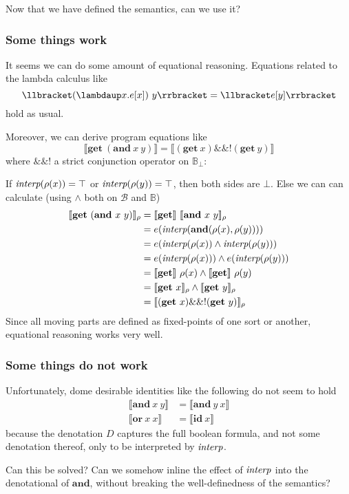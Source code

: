 \documentclass[manuscript,screen,acmsmall,nonacm]{acmart}
\newcommand{\syntax}[1]{\mathbf{#1}}
\newcommand{\slambda}{\syntax{\lambdaup}}
\newcommand{\sGet}{\syntax{get}}
\newcommand{\sAnd}{\syntax{and}}
\newcommand{\sOr}{\syntax{or}}
\newcommand{\sId}{\syntax{id}}
\newcommand{\dBool}{\mathbb B}
\newcommand{\rBool}{\mathscr B}
\newcommand{\D}[1]{\llbracket #1 \rrbracket}
\begin{document}
Now that we have defined the semantics, can we use it?

\subsubsection{Some things work}

It seems we can do some amount of equational reasoning. Equations related to the lambda calculus like
\[
\D{(\slambda x. e[x])~y} = \D{e[y]}
\]
hold as usual.

Moreover, we can derive program equations like
\[
\D{\sGet~(\sAnd~x~y)} = \D{(\sGet~x) \syntax{\&\&!} (\sGet~y)}
\]
where $\syntax{\&\&!}$ a strict conjunction operator on $\dBool_\bot$:

If $\operatorname{\textit{interp}}(\rho(x)) = \top$ or $\operatorname{\textit{interp}}(\rho(y)) = \top$, then both sides are $\bot$. Else we can can calculate (using $\wedge$ both on $\rBool$ and $\dBool$)
\begin{align*}
\D{\sGet~(\sAnd~x~y)}_\rho 
&= \D{\sGet}~\D{\sAnd~x~y}_\rho  \\
&= e(\interp(\sAnd(\rho(x), \rho(y)))) \\
&= e(\interp(\rho(x)) \wedge \interp(\rho(y))) \\
&= e(\interp(\rho(x))) \wedge e(\interp(\rho(y))) \\
&= \D{\sGet}~\rho(x) \wedge \D{\sGet}~\rho(y) \\
&= \D{\sGet~x}_\rho \wedge \D{\sGet~y}_\rho \\
&= \D{(\sGet~x)\syntax{\&\&!} (\sGet~y)}_\rho
\end{align*}
Since all moving parts are defined as fixed-points of one sort or another, equational reasoning works very well.

\subsubsection{Some things do not work}

Unfortunately, dome desirable identities like the following do not seem to hold
\begin{align*}
\D{\sAnd~x~y} &= \D{\sAnd~y~x} \\
\D{\sOr~x~x} &= \D{\sId~x}
\end{align*}
because the denotation $D$ captures the full boolean formula, and not some denotation thereof, only to be interpreted by $\operatorname{\textit{interp}}$.

Can this be solved? Can we somehow inline the effect of $\operatorname{\textit{interp}}$ into the denotational of $\sAnd$, without breaking the well-definedness of the semantics?
\end{document}
